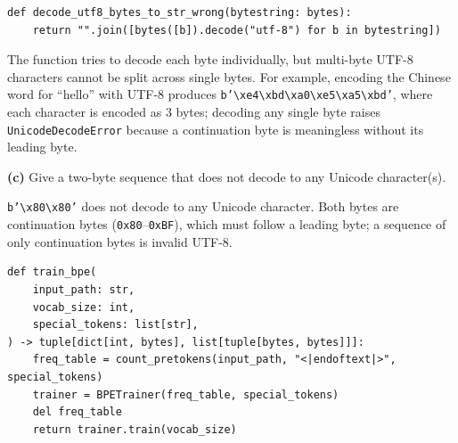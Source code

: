 
\par\noindent
\begin{minipage}{\linewidth}
\begin{lstlisting}[caption={Incorrect UTF-8 decoding function}]
def decode_utf8_bytes_to_str_wrong(bytestring: bytes):
    return "".join([bytes([b]).decode("utf-8") for b in bytestring])
\end{lstlisting}
\end{minipage}\par

The function tries to decode each byte individually, but multi-byte UTF-8 characters cannot be split across single bytes. For example, encoding the Chinese word for ``hello'' with UTF-8 produces \texttt{b'\textbackslash xe4\textbackslash xbd\textbackslash xa0\textbackslash xe5\textbackslash xa5\textbackslash xbd'}, where each character is encoded as 3 bytes; decoding any single byte raises \texttt{UnicodeDecodeError} because a continuation byte is meaningless without its leading byte.

\textbf{(c)} Give a two-byte sequence that does not decode to any Unicode character(s).


\texttt{b'\textbackslash x80\textbackslash x80'} does not decode to any Unicode character. Both bytes are continuation bytes (\texttt{0x80}--\texttt{0xBF}), which must follow a leading byte; a sequence of only continuation bytes is invalid UTF-8.



\par\noindent
\begin{minipage}{\linewidth}
\begin{lstlisting}[caption={BPE training function}]
def train_bpe(
    input_path: str,
    vocab_size: int,
    special_tokens: list[str],
) -> tuple[dict[int, bytes], list[tuple[bytes, bytes]]]:
    freq_table = count_pretokens(input_path, "<|endoftext|>", special_tokens)
    trainer = BPETrainer(freq_table, special_tokens)
    del freq_table
    return trainer.train(vocab_size)
\end{lstlisting}
\end{minipage}\par

